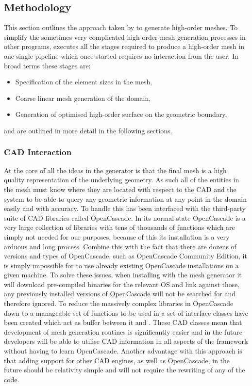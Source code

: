 \subsection{Methodology}

This section outlines the approach taken by \mc to generate high-order meshes.
%
To simplify the sometimes very complicated high-order mesh generation processes
in other programs, \mc executes all the stages required to produce a high-order
mesh in one single pipeline which once started requires no interaction from the
user. In broad terms these stages are:
\begin{itemize}
	\item Specification of the element sizes in the mesh,
	\item Coarse linear mesh generation of the domain,
	\item Generation of optimised high-order surface on the geometric boundary,
\end{itemize}
%
and are outlined in more detail in the following sections.

\subsubsection{CAD Interaction}

At the core of all the ideas in the \mc generator is that the final mesh is a
high quality representation of the underlying geometry. As such all of the
entities in the mesh must know where they are located with respect to the CAD
and the system to be able to query any geometric information at any point in the
domain easily and with accuracy. To handle this \mc has been interfaced with the
third-party suite of CAD libraries called OpenCascade. In its normal state
OpenCascade is a very large collection of libraries with tens of thousands of
functions which are simply not needed for our purposes, because of this its
installation is a very arduous and long process. Combine this with the fact that
there are dozens of versions and types of OpenCascade, such as OpenCascade
Community Edition, it is simply impossible for \mc to use already existing
OpenCascade installations on a given machine. To solve these issues, when
installing \nekpp with the mesh generator it will download pre-compiled binaries
for the relevant OS and link against those, any previously installed versions of
OpenCascade will not be searched for and therefore ignored.
%
To reduce the massively complex libraries in OpenCascade down to a manageable
set of functions to be used in \mc a set of interface classes have been created
which act as buffer between it and \nekpp. These CAD classes mean that
development of mesh generation routines is significantly easier and in the
future \nekpp developers will be able to utilise CAD information in all aspects
of the framework without having to learn OpenCascade. Another advantage with
this approach is that adding support for other CAD engines, as well as
OpenCascade, in the future should be relativity simple and will not require the
rewriting of any of the \mc code.

